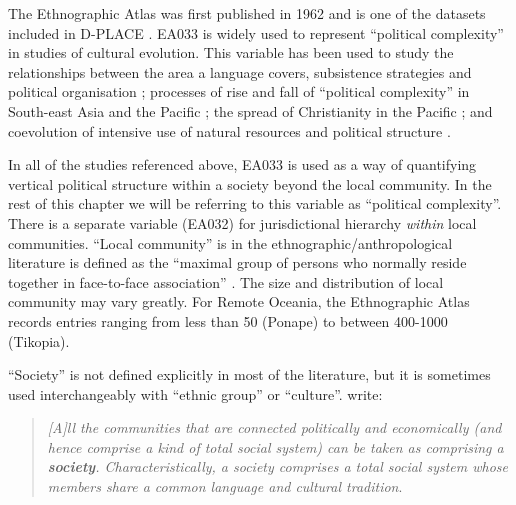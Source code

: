 \documentclass[a4paper,10pt]{article} %
\begin{document}
The Ethnographic Atlas was first published in 1962 and is one of the datasets included in D-PLACE \citep{d_place_all}. EA033 is widely used to represent ``political complexity'' in studies of cultural evolution. This variable has been used to study the relationships between the area a language covers, subsistence strategies and political organisation \citep{curriemace2009}; processes of rise and fall of ``political complexity'' in South-east Asia and the Pacific \citep{currie2010rise}; the spread of Christianity in the Pacific \citep{watts_2018}; and coevolution of intensive use of natural resources and political structure \citep{sheehan2018coevolution}.  

In all of the studies referenced above, EA033 is used as a way of quantifying vertical political structure within a society beyond the local community. In the rest of this chapter we will be referring to this variable as ``political complexity''. There is a separate variable (EA032) for jurisdictional hierarchy \emph{within} local communities. ``Local community'' is in the ethnographic/anthropological literature is defined as the ``maximal group of persons who normally reside together in face-to-face association'' \citep{yale1945outline}. The size and distribution of local community may vary greatly. For Remote Oceania, the Ethnographic Atlas records entries ranging from less than 50 (Ponape) to between 400-1000 (Tikopia).

``Society'' is not defined explicitly in most of the literature, but it is sometimes used interchangeably with ``ethnic group'' or ``culture''. \citet{roger1981cultural} write:

\begin{quotation}
\noindent\emph{[A]ll the communities that are connected politically and economically (and hence comprise a kind of total social system) can be taken as comprising a \textbf{society}. Characteristically, a society comprises a total social system whose members share a common language and cultural tradition}. 
\begin{flushright}
\citep[22]{roger1981cultural} 
\end{flushright}
 \end{quotation}

\end{document}

